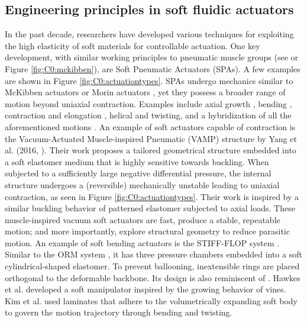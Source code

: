 \subsection{Engineering principles in soft fluidic actuators}
In the past decade, researchers have developed various techniques for exploiting the high elasticity of soft materials for controllable actuation. One key development, with similar working principles to pneumatic muscle groups (see \cite{Mckibben,Morin1953} or Figure \ref{fig:C0:mckibben}), are Soft Pneumatic Actuators (SPAs). A few examples are shown in Figure \ref{fig:C0:actuationtypes}. SPAs undergo mechanics similar to McKibben actuators \cite{Mckibben} or Morin actuators \cite{Morin1953}, yet they possess a broader range of motion beyond uniaxial contraction. Examples include axial growth \cite{Hawkes2017}, bending \cite{Mosadegh2014,Galloway2016,Marchese2016}, contraction and elongation \cite{Yang2016}, helical and twisting, and a hybridization of all the aforementioned motions \cite{Kim2019Aug}. An example of soft actuators capable of contraction is the Vacuum-Actuated Muscle-inspired Pneumatic (VAMP) structure by Yang et al. (2016, \cite{Yang2016}). Their work proposes a tailored geometrical structure embedded into a soft elastomer medium that is highly sensitive towards buckling. When subjected to a sufficiently large negative differential pressure, the internal structure undergoes a (reversible) mechanically unstable leading to uniaxial contraction, as seen in Figure \ref{fig:C0:actuationtypes}. Their work is inspired by a similar buckling behavior of patterned elastomer \cite{Bertoldi2008,Mullin2007,Shim2013Aug} subjected to axial loads. These muscle-inspired vacuum soft actuators are fast, produce a stable, repeatable motion; and more importantly, explore structural geometry to reduce parasitic motion. An example of soft bending actuators is the STIFF-FLOP system \cite{Cianchetti2013Nov}. Similar to the ORM system \cite{BibEntryOrm2019Sep}, it has three pressure chambers embedded into a soft cylindrical-shaped elastomer. To prevent ballooning, inextensible rings are placed orthogonal to the deformable backbone. Its design is also reminiscent of \cite{Suzumori1992,Suzumori1991}. Hawkes et al. \cite{Hawkes2017} developed a soft manipulator inspired by the growing behavior of vines. Kim et al. \cite{Kim2019Aug} used laminates that adhere to the volumetrically expanding soft body to govern the motion trajectory through bending and twisting.
